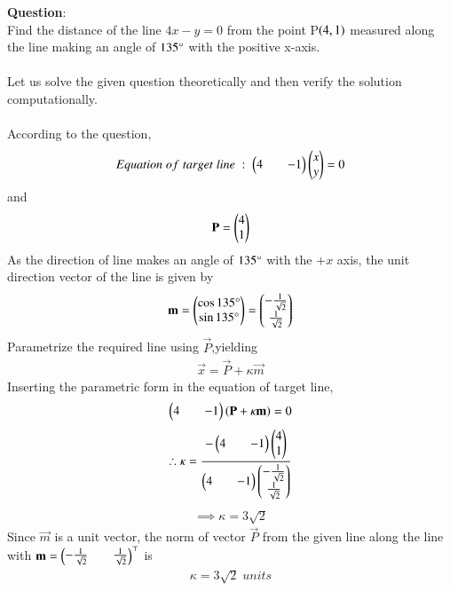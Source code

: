 \documentclass[journal]{IEEEtran}
\begin{document}
\textbf{Question}:\\
Find the distance of the line $4x-y=0$ from the point P$\left(4,1\right)$ measured along the line making an angle of $135\degree$ with the positive x-axis.\\
\solution \\
Let us solve the given question theoretically and then verify the solution computationally.\\
\\
According to the question,\\
\begin{align*}
    Equation\;of\;target\;line\;:\;\begin{pmatrix}4&&-1\end{pmatrix}\begin{pmatrix}x\\y\end{pmatrix}=0
\end{align*}
and
\begin{align*}
    \mathbf{P}=\begin{pmatrix}4\\1\end{pmatrix}
\end{align*}
As the direction of line makes an angle of $135\degree$ with the $+x$ axis, the unit direction vector of the line is given by
\begin{align*}
    \mathbf{m}=\begin{pmatrix}\cos{135\degree}\\\sin{135\degree}\end{pmatrix}=\begin{pmatrix}-\frac{1}{\sqrt{2}}\\\frac{1}{\sqrt{2}}\end{pmatrix}
\end{align*}
Parametrize the required line using $\vec{P}$,yielding
\begin{align*}
    \vec{x}=\vec{P}+\kappa\vec{m}
\end{align*}
Inserting the parametric form in the equation of target line,
\begin{align*}
    \begin{pmatrix}4&&-1\end{pmatrix}\left(\mathbf{P}+\kappa\mathbf{m}\right)=0
\end{align*}
\begin{align*}
    \therefore \kappa=\frac{-\begin{pmatrix}4&&-1\end{pmatrix}\begin{pmatrix}4\\1\end{pmatrix}}{\begin{pmatrix}4&&-1\end{pmatrix}\begin{pmatrix}-\frac{1}{\sqrt{2}}\\\frac{1}{\sqrt{2}}\end{pmatrix}}
\end{align*}
\begin{align*}
    \implies \kappa=3\sqrt{2}
\end{align*}
\newpage
\vspace*{0.25cm}
Since $\vec{m}$ is a unit vector, the norm of vector $\vec{P}$ from the given line along the line with $\mathbf{m}=\begin{pmatrix}-\frac{1}{\sqrt{2}}&&\frac{1}{\sqrt{2}}\end{pmatrix}^{\top}$ is
\begin{align*}
    \kappa=3\sqrt{2}\;units
\end{align*}
\\
\end{document}
